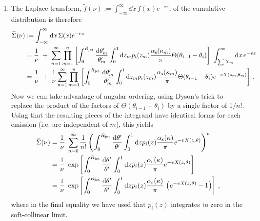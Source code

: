 \begin{enumerate}[label=\alph*)]
    \item
    The Laplace transform, \(\widetilde{f}(\nu) := \int_{-\infty}^\infty \dd x\, f(x) e^{-\nu x}\), of the cumulative distribution is therefore
    \begin{align}
        \widetilde\Sigma(\nu)
        &:=
        \int_{-\infty}^\infty \dd x\, \Sigma(x) e^{-\nu x}
        \\
        &=
        \frac{1}{\nu}
        \,\,+\,\,
        \sum_{n=1}^\infty \prod_{m=1}^n  \left[
            \int_0^{R_\text{jet}} \frac{\dd \theta'_m}{\theta'_m}
            \int_0^1 \dd z_m p_i(z_m)
            \frac{\alpha_{\mathrm{s}}(\kappa_m)}{\pi}
            \Theta(\theta_{i-1} - \theta_i)
        \right]
        \,\,
        \int^\infty_{\sum X_m} \dd x \, e^{-v x}
        \\
        &=
        \frac{1}{\nu}
        \,\,+\,\,
        \frac{1}{\nu}
        \sum_{n=1}^\infty \prod_{m=1}^n  \left[
            \int_0^{R_\text{jet}} \frac{\dd \theta'_m}{\theta'_m}
            \int_0^1 \dd z_m p_i(z_m)
            \frac{\alpha_{\mathrm{s}}(\kappa_m)}{\pi}
            \Theta(\theta_{i-1} - \theta_i)
            e^{-v X(z_m, \theta_m)}
        \right]
        \,.
    \end{align}
    Now we can take advantage of angular ordering, using Dyson's trick to replace the product of the factors of \(\Theta(\theta_{i-1} - \theta_i)\) by a single factor of \(1 / n!\).
    Using that the resulting pieces of the integrand have identical forms for each emission (i.e. are independent of \(m\)), this yields
    \begin{align}
        \widetilde\Sigma(\nu)
        &=
        \frac{1}{\nu}
        \,\,
        \sum_{n=0}^\infty \frac{1}{n!}
        \left(
            \int_0^{R_\text{jet}} \frac{\dd \theta'}{\theta'}
            \int_0^1 \dd z p_i(z)
            \frac{\alpha_{\mathrm{s}}(\kappa)}{\pi}
            e^{-v X(z, \theta)}
        \right)^n
        \\
        &=
        \frac{1}{\nu}
        \,\,
        \exp\left[
            \int_0^{R_\text{jet}} \frac{\dd \theta'}{\theta'}
            \int_0^1 \dd z p_i(z)
            \frac{\alpha_{\mathrm{s}}(\kappa)}{\pi}
            e^{-v X(z, \theta)}
        \right]
        \\
        &=
        \frac{1}{\nu}
        \,\,
        \exp\left[
            \int_0^{R_\text{jet}} \frac{\dd \theta'}{\theta'}
            \int_0^1 \dd z p_i(z)
            \frac{\alpha_{\mathrm{s}}(\kappa)}{\pi}
            \,
            \left(e^{-v X(z, \theta)} - 1\right)
        \right]
        \,,
    \end{align}
    where in the final equality we have used that \(p_i(z)\) integrates to zero in the soft-collinear limit.


\end{enumerate}
